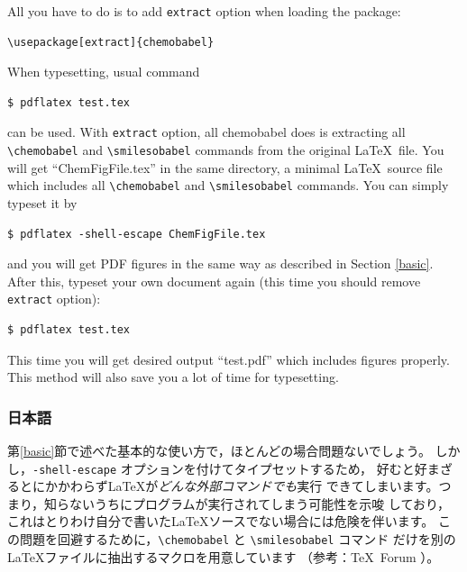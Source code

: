 \documentclass[12pt]{ltjsarticle}
\begin{document}
All you have to do is to add \verb|extract| option when loading the package:
\begin{verbatim}
\usepackage[extract]{chemobabel}
\end{verbatim}
When typesetting, usual command
\begin{verbatim}
$ pdflatex test.tex
\end{verbatim}
can be used. 
With \verb|extract| option, all \textsf{chemobabel} does is extracting
all \verb|\chemobabel| and \verb|\smilesobabel| commands from the
original \LaTeX\ file.
You will get ``ChemFigFile.tex'' in the same directory, a minimal
\LaTeX\ source file which includes all \verb|\chemobabel| and
\verb|\smilesobabel| commands.
You can simply typeset it by
\begin{verbatim}
$ pdflatex -shell-escape ChemFigFile.tex
\end{verbatim}
and you will get PDF figures in the same way
as described in Section \ref{basic}.
After this, typeset your own document again
(this time you should remove \verb|extract| option):
\begin{verbatim}
$ pdflatex test.tex
\end{verbatim}
This time you will get desired output ``test.pdf''
which includes figures properly.
This method will also save you a lot of time for typesetting.

\clearpage

\subsubsection{日本語}

第\ref{basic}節で述べた基本的な使い方で，ほとんどの場合問題ないでしょう。
しかし，\verb|-shell-escape| オプションを付けてタイプセットするため，
好むと好まざるとにかかわらず\LaTeX が\emph{どんな外部コマンドでも}実行
できてしまいます。つまり，知らないうちにプログラムが実行されてしまう可能性を示唆
しており，これはとりわけ自分で書いた\LaTeX ソースでない場合には危険を伴います。
この問題を回避するために，\verb|\chemobabel| と \verb|\smilesobabel| コマンド
だけを別の \LaTeX ファイルに抽出するマクロを用意しています
（参考：\TeX\ Forum \cite{OKU}）。
\end{document}

